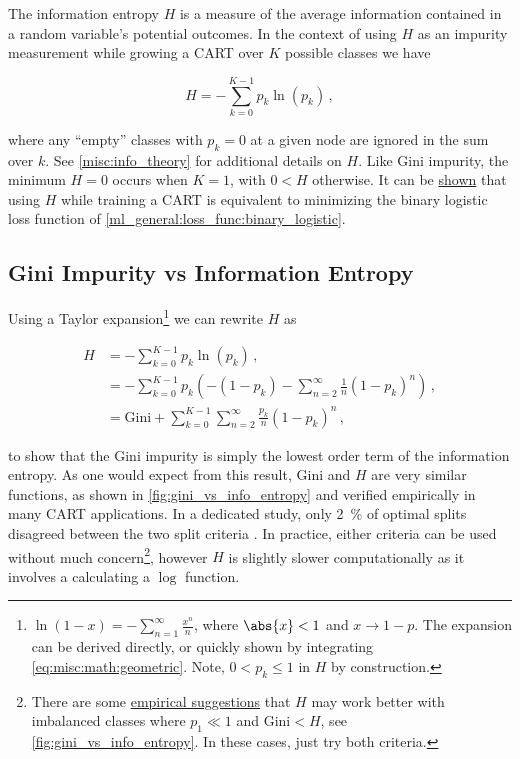 The information entropy $H$ is a measure of the average
information contained in a random variable's potential outcomes.
In the context of using $H$ as an impurity measurement while growing a CART
over $K$ possible classes we have

\begin{equation} \label{eq:info_entropy_cart}
H = -\sum_{k=0}^{K-1} p_{k} \ln\left(p_{k}\right) \, ,
\end{equation}

\noindent where any ``empty'' classes with $p_{k}=0$
at a given node are ignored in the sum over $k$.
See \cref{misc:info_theory} for additional details on $H$.
Like Gini impurity, the minimum $H = 0$ occurs when $K=1$, with $0 < H$ otherwise.
It can be \href{https://scikit-learn.org/stable/modules/tree.html#classification-criteria}{shown} \cite{sklearn}
that using $H$ while training a CART is equivalent to minimizing
the binary logistic loss function of \cref{ml_general:loss_func:binary_logistic}.

\subsection{Gini Impurity vs Information Entropy}
\label{class:CART:gini_vs_info_entropy}

Using a Taylor expansion\footnote{$\ln\left(1-x\right) = -\sum_{n=1}^{\infty} \frac{x^{n}}{n}$,
where $\abs{x} < 1$ and $x \to 1-p$.
The expansion can be derived directly,
or quickly shown by integrating \cref{eq:misc:math:geometric}.
Note, $0 < p_{k} \leq 1$ in $H$ by construction.} we can rewrite $H$ as

\begin{equation} \label{eq:info_entropy_expanded}
\begin{aligned}
H &= -\sum_{k=0}^{K-1} p_{k} \ln\left(p_{k}\right)\, , \\
&= -\sum_{k=0}^{K-1} p_{k} \left(
-\left(1-p_{k}\right)
-\sum_{n=2}^{\infty} \frac{1}{n}\left(1-p_{k}\right)^{n} \right)\, , \\
&= \text{Gini} + \sum_{k=0}^{K-1} \sum_{n=2}^{\infty} \frac{p_{k}}{n} \left(1-p_{k}\right)^{n}\, ,
\end{aligned}
\end{equation}

\noindent to show that the Gini impurity is simply the lowest order term of the information entropy.
As one would expect from this result,
$\text{Gini}$ and $H$ are very similar functions,
as shown in \cref{fig:gini_vs_info_entropy}
and verified empirically in many CART applications.
In a dedicated study, only \SI{2}{\percent} of optimal splits
disagreed between the two split criteria \cite{Raileanu2004}.
In practice, either criteria can be used without much concern\footnote{There
are some \href{https://ekamperi.github.io/machine\%20learning/2021/04/13/gini-index-vs-entropy-decision-trees.html}{empirical suggestions} that
$H$ may work better with imbalanced classes where $p_{1} \ll 1$ and $\text{Gini} < H$,
see \cref{fig:gini_vs_info_entropy}.
In these cases, just try both criteria.},
however $H$ is slightly slower computationally
as it involves a calculating a $\log$ function.

